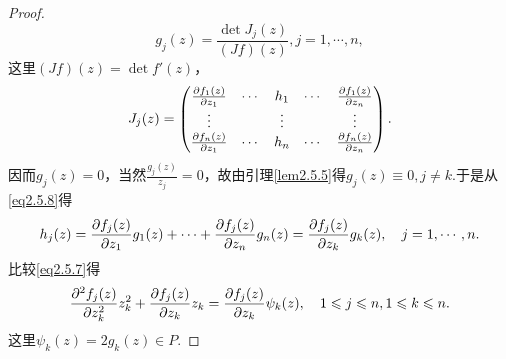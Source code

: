 \begin{proof}
\[g_j(z)=\frac{\det J_j(z)}{(J f)(z)},j=1,\cdots,n,\]
这里$(Jf)(z)=\det f'(z)$，
\[J_j(z)=\begin{pmatrix}
	\frac{\partial f_1(z)}{\partial z_1} & \cdots & h_1 & \cdots &\frac{\partial f_1(z)}{\partial z_n}\\
	\vdots & & \vdots & & \vdots\\
	\frac{\partial f_n(z)}{\partial z_1} & \cdots & h_n & \cdots & \frac{\partial f_n(z)}{\partial z_n}
\end{pmatrix}.\]
因而$g_j(z)=0$，当然$\frac{g_j(z)}{z_j}=0$，故由引理\ref{lem2.5.5}得$g_j(z)\equiv0,j\neq k$.于是从\eqref{eq2.5.8}得
\[h_j(z)=\frac{\partial f_j(z)}{\partial z_1}g_1(z)+\cdots+\frac{\partial f_j(z)}{\partial z_n}g_n(z)=\frac{\partial f_j(z)}{\partial z_k}g_k(z),\quad j=1,\cdots,n.\]
比较\eqref{eq2.5.7}得
\begin{equation}\label{eq2.5.9}
	\frac{\partial^2 f_j(z)}{\partial z_k^2} z_k^2 +\frac{\partial f_j(z)}{\partial z_k}z_k=\frac{\partial f_j(z)}{\partial z_k}\psi_k(z),\quad 1\leqslant j\leqslant n,1\leqslant k\leqslant n.
\end{equation}
这里$\psi_k(z)=2g_k(z)\in P$.


\end{proof}
